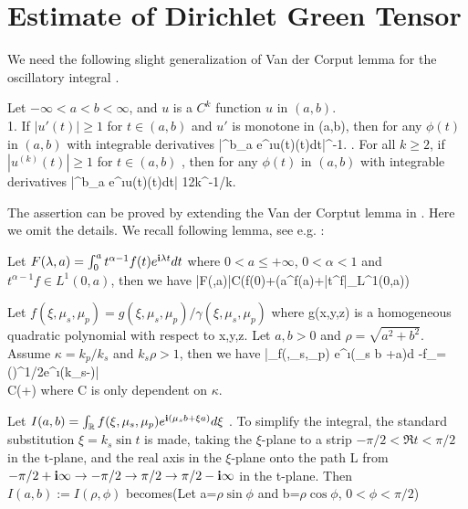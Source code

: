 \documentclass[12pt]{iopart}
\begin{document}
\section{Estimate of Dirichlet Green Tensor}
We need the following slight generalization of Van der Corput lemma for the oscillatory integral \cite[P.152]{grafakos}.
\begin{lem}\label{van}
	Let $-\infty<a<b<\infty$, and $u$ is a $C^k$ function $u$ in $(a,b)$. \\
 1. If $|u'(t)|\ge 1$ for $t\in (a,b)$ and $u'$ is monotone in (a,b), then for any $\phi(t)$ in $(a,b)$ with integrable derivatives
	\ben
	\left|\int^b_a e^{\i\lambda u(t)}\phi(t)dt\right|\lambda^{-1}.
	. For all $k\geq2$, if $|u^{(k)}(t)|\ge 1$ for $t\in (a,b)$ , then for any $\phi(t)$ in $(a,b)$ with integrable derivatives
	\ben
	\left|\int^b_a e^{\i\lambda u(t)}\phi(t)dt\right|\le
	12k\lambda^{-1/k}.
	\een
\end{lem}
\debproof
The assertion can be proved by extending the Van der Corptut lemma in \cite{grafakos}. Here we omit the details.
\finproof
We recall following lemma, see e.g. \cite{Wong_Asymptotic}:
\begin{lem} \label{asym_frac}
	Let $F(\lambda,a)=\int_{0}^{a} t^{\alpha-1}f(t)e^{\mathbf{i}\lambda t}dt$ where $0<a\leq+\infty$, $0<\alpha<1$ and $t^{\alpha-1}f\in L^1(0,a)$, then we have
	\be
	|F(\lambda,a)|\leq C(f(0)+(a^{}f(a)+|t^{}f|_{L^1(0,a)})
	\ee
\end{lem}
\begin{lem}\label{pr_dgreen}
	Let $f(\xi,\mu_s,\mu_p)=g(\xi,\mu_s,\mu_p)/\gamma(\xi,\mu_s,\mu_p)$ where g(x,y,z) is a homogeneous quadratic polynomial with respect to x,y,z. Let $a,b>0$ and $\rho=\sqrt{a^2+b^2}$. Assume $\kappa=k_p/k_s$ and $k_s\rho >1$, then we have
	\be \label{pr_dgreen1} \nn
	\Big|\int_\R f(\xi,\mu_s,\mu_p) e^{\i(\mu_s b +\xi a)}d\xi
	-f_{\xi=}()^{1/2}e^{\i(k_s\rho-)}\Big|
	\\ \hspace{-0.5cm}
	 \leq C(+)
	\ee
	where C is only dependent on $\kappa$.
\end{lem}
\debproof
Let $I(a,b)=\int_{\mathbb{R}} f(\xi,\mu_s,\mu_p) e^{\mathbf{i}(\mu_s b +\xi a)}d\xi$ . To simplify the integral, the standard substitution $\xi=k_s\sin t$ is made, taking the $\xi$-plane to a strip $-\pi/2<\Re t <\pi/2$ in the t-plane, and the real axis in the $\xi$-plane onto the path L from $-\pi/2+\mathbf{i}\infty\rightarrow-\pi/2\rightarrow\pi/2\rightarrow\pi/2-\mathbf{i}\infty$ in the t-plane. Then $I(a,b):=I(\rho,\phi)$ becomes(Let a=$\rho \sin\phi$  and b=$\rho\cos\phi$, $0<\phi<\pi/2$)
\end{document}

